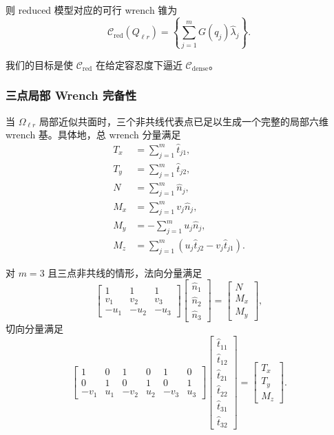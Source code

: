 \documentclass[UTF8,a4paper,11pt]{ctexart}
\begin{document}
则 reduced 模型对应的可行 wrench 锥为
\begin{equation}
\mathcal{C}_{\mathrm{red}}(Q_{\ell r})
=
\left\{
\sum_{j=1}^{m} G(q_j)\hat{\lambda}_j
\right\}.
\end{equation}

我们的目标是使 $\mathcal{C}_{\mathrm{red}}$ 在给定容忍度下逼近 $\mathcal{C}_{\mathrm{dense}}$。

\subsubsection{三点局部 Wrench 完备性}

当 $\Omega_{\ell r}$ 局部近似共面时，三个非共线代表点已足以生成一个完整的局部六维 wrench 基。具体地，总 wrench 分量满足
\begin{equation}
\begin{aligned}
T_x &= \sum_{j=1}^{m} \hat{t}_{j1},\\
T_y &= \sum_{j=1}^{m} \hat{t}_{j2},\\
N   &= \sum_{j=1}^{m} \hat{n}_j,\\
M_x &= \sum_{j=1}^{m} v_j \hat{n}_j,\\
M_y &= -\sum_{j=1}^{m} u_j \hat{n}_j,\\
M_z &= \sum_{j=1}^{m}\left(u_j \hat{t}_{j2}-v_j \hat{t}_{j1}\right).
\end{aligned}
\end{equation}

对 $m=3$ 且三点非共线的情形，法向分量满足
\begin{equation}
\begin{bmatrix}
1 & 1 & 1\\
v_1 & v_2 & v_3\\
-u_1 & -u_2 & -u_3
\end{bmatrix}
\begin{bmatrix}
\hat{n}_1\\
\hat{n}_2\\
\hat{n}_3
\end{bmatrix}
=
\begin{bmatrix}
N\\
M_x\\
M_y
\end{bmatrix},
\end{equation}
切向分量满足
\begin{equation}
\begin{bmatrix}
1 & 0 & 1 & 0 & 1 & 0\\
0 & 1 & 0 & 1 & 0 & 1\\
-v_1 & u_1 & -v_2 & u_2 & -v_3 & u_3
\end{bmatrix}
\begin{bmatrix}
\hat{t}_{11}\\
\hat{t}_{12}\\
\hat{t}_{21}\\
\hat{t}_{22}\\
\hat{t}_{31}\\
\hat{t}_{32}
\end{bmatrix}
=
\begin{bmatrix}
T_x\\
T_y\\
M_z
\end{bmatrix}.
\end{equation}
\end{document}
